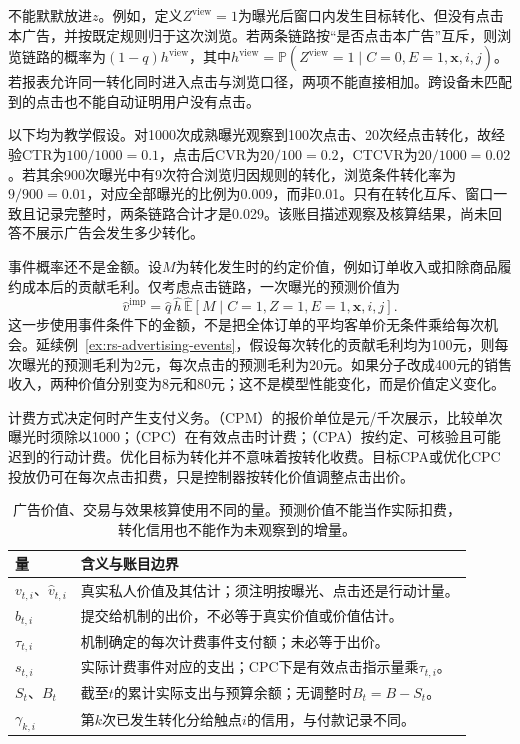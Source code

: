 不能默默放进$z$。例如，定义$Z^{\mathrm{view}}=1$为曝光后窗口内发生目标转化、但没有点击本广告，并按既定规则归于这次浏览。若两条链路按“是否点击本广告”互斥，则浏览链路的概率为$(1-q)h^{\mathrm{view}}$，其中$h^{\mathrm{view}}=\mathbb{P}(Z^{\mathrm{view}}=1\mid C=0,E=1,\bm{x},i,j)$。若报表允许同一转化同时进入点击与浏览口径，两项不能直接相加。跨设备未匹配到的点击也不能自动证明用户没有点击。

\begin{example}[固定窗口的广告事件账目]
\label{ex:rs-advertising-events}
以下均为教学假设。对1000次成熟曝光观察到100次点击、20次经点击转化，故经验CTR为$100/1000=0.1$，点击后CVR为$20/100=0.2$，CTCVR为$20/1000=0.02$。若其余900次曝光中有9次符合浏览归因规则的转化，浏览条件转化率为$9/900=0.01$，对应全部曝光的比例为0.009，而非0.01。只有在转化互斥、窗口一致且记录完整时，两条链路合计才是0.029。该账目描述观察及核算结果，尚未回答不展示广告会发生多少转化。
\end{example}

事件概率还不是金额。设$M$为转化发生时的约定价值，例如订单收入或扣除商品履约成本后的贡献毛利。仅考虑点击链路，一次曝光的预测价值为
\begin{equation}
  \widehat v^{\mathrm{imp}}
  =\widehat q\,\widehat h\,
    \widehat{\mathbb{E}}[M\mid C=1,Z=1,E=1,\bm{x},i,j].
  \label{eq:rs-advertising-value}
\end{equation}
这一步使用事件条件下的金额，不是把全体订单的平均客单价无条件乘给每次机会。延续例~\ref{ex:rs-advertising-events}，假设每次转化的贡献毛利均为100元，则每次曝光的预测毛利为2元，每次点击的预测毛利为20元。如果分子改成400元的销售收入，两种价值分别变为8元和80元；这不是模型性能变化，而是价值定义变化。

计费方式决定何时产生支付义务。（CPM）的报价单位是元/千次展示，比较单次曝光时须除以1000；（CPC）在有效点击时计费；（CPA）按约定、可核验且可能迟到的行动计费。优化目标为转化并不意味着按转化收费。目标CPA或优化CPC投放仍可在每次点击扣费，只是控制器按转化价值调整点击出价。

\begin{table}[htbp]
  \centering
  \begin{tabularx}{\linewidth}{@{}lX@{}}
    \toprule
    量 & 含义与账目边界\\
    \midrule
    $v_{t,i}$、$\widehat v_{t,i}$ & 真实私人价值及其估计；须注明按曝光、点击还是行动计量。\\
    $b_{t,i}$ & 提交给机制的出价，不必等于真实价值或价值估计。\\
    $\tau_{t,i}$ & 机制确定的每次计费事件支付额；未必等于出价。\\
    $s_{t,i}$ & 实际计费事件对应的支出；CPC下是有效点击指示量乘$\tau_{t,i}$。\\
    $S_t$、$B_t$ & 截至$t$的累计实际支出与预算余额；无调整时$B_t=B-S_t$。\\
    $\gamma_{k,i}$ & 第$k$次已发生转化分给触点$i$的信用，与付款记录不同。\\
    \bottomrule
  \end{tabularx}
  \caption{广告价值、交易与效果核算使用不同的量。预测价值不能当作实际扣费，转化信用也不能作为未观察到的增量。}
  \label{tab:rs-advertising-ledger}
\end{table}

